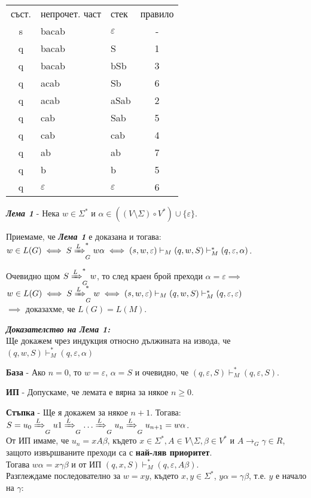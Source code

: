\documentclass[fleqn,12pt]{article}
\begin{document}
\begin{flushleft}
\begin{tabular}{ |c|l|l|c| } 
\hline
съст. & непрочет. част & стек & правило \\ 
s & bacab & $\varepsilon$ & - \\
q & bacab & S & 1 \\
q & bacab & bSb & 3 \\
q & acab & Sb & 6 \\
q & acab & aSab & 2 \\
q & cab & Sab & 5 \\
q & cab & cab & 4 \\
q & ab & ab & 7 \\
q & b & b & 5 \\
q & $\varepsilon$ & $\varepsilon$ & 6 \\
\hline
\end{tabular}

\textit{\textbf{Лема 1}} - Нека $w \in \Sigma^*$ и $\alpha \in ((V \setminus \Sigma) \circ V^*) \cup \{\varepsilon\}$. 

Приемаме, че \textit{\textbf{Лема 1}} е доказана и тогава: \\
$w \in L(G) \iff S \xRightarrow[]{L}_G^* w\alpha \iff (s, w, \varepsilon) \vdash_M (q, w, S) \vdash_M^* (q, \varepsilon, \alpha)$.

Очевидно щом $S \xRightarrow[]{L}_G^* w$, то след краен брой преходи $\alpha = \varepsilon \implies$ \\
$w \in L(G) \iff S \xRightarrow[]{L}_G^* w \iff (s, w, \varepsilon) \vdash_M (q, w, S) \vdash_M^* (q, \varepsilon, \varepsilon)$ \\
$\implies$ доказахме, че $L(G) = L(M)$.

\textit{\textbf{Доказателство на Лема 1:}} \\

Ще докажем чрез индукция относно дължината на извода, че $(q, w, S) \vdash_M^* (q, \varepsilon, \alpha)$

\textbf{База} - Ако $n = 0$, то $w=\varepsilon$, $\alpha = S$ и очевидно, че $(q, \varepsilon, S) \vdash_M^* (q, \varepsilon, S)$.

\textbf{ИП} - Допускаме, че лемата е вярна за някое $n \geq 0$.

\textbf{Стъпка} - Ще я докажем за някое $n + 1$. Тогава: \\

$S = u_0 \xRightarrow[]{L}_G u1 \xRightarrow[]{L}_G \dots \xRightarrow[]{L}_G u_n \xRightarrow[]{L}_G u_{n+1} = w\alpha$. \\
От ИП имаме, че $u_n = xA\beta$, където $x \in \Sigma^*, A \in V \setminus \Sigma, \beta \in V^*$ и $A \to_G \gamma \in R$, защото извършваните преходи са с \textbf{най-ляв приоритет}. \\
Тогава $w\alpha = x\gamma\beta$ и от ИП $(q, x, S) \vdash_M^* (q, \varepsilon, A\beta)$. \\
Разглеждаме последователно за $w = xy$, където $x, y \in \Sigma^*$, $y\alpha = \gamma\beta$, т.е. $y$ е начало на $\gamma$: \\


\end{flushleft}
\end{document}
